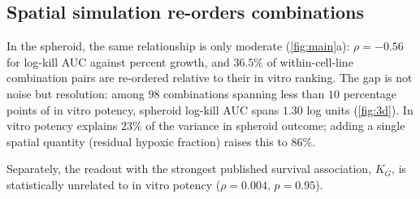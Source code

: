 \documentclass{article}
\begin{document}
\subsection{Spatial simulation re-orders combinations}

In the spheroid, the same relationship is only moderate (\cref{fig:main}a): $\rho = -0.56$ for
log-kill AUC against percent growth, and $36.5\%$ of within-cell-line
combination pairs are re-ordered relative to their in vitro ranking. The gap
is not noise but resolution: among $98$ combinations spanning less than
$10$ percentage points of in vitro potency, spheroid log-kill AUC spans
$1.30$ log units (\cref{fig:3d}). In vitro potency explains $23\%$ of the variance
in spheroid outcome; adding a single spatial quantity (residual hypoxic
fraction) raises this to $86\%$.

Separately, the readout with the strongest published survival association,
$K_G$, is statistically unrelated to in vitro potency
($\rho = 0.004$, $p = 0.95$).
\end{document}
